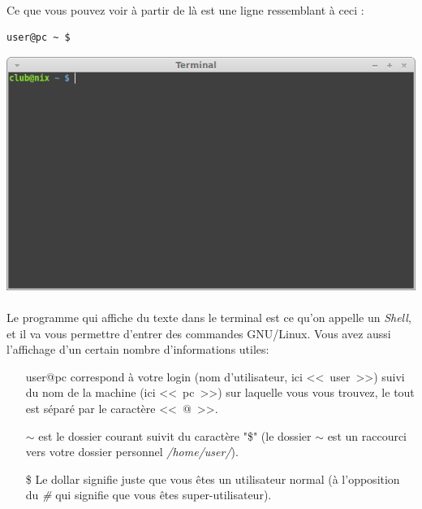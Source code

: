 \documentclass[french, a4paper, 12pt, titlepage]{article}
\begin{document}
\paragraph{} Ce que vous pouvez voir à partir de là est une ligne ressemblant à
ceci :
\begin{lstlisting}
user@pc ~ $
\end{lstlisting}


\begin{center}
	\includegraphics[scale=0.42]{Images/terminal}
\end{center}

\newpage
\paragraph{} Le programme qui affiche du texte dans le terminal est ce qu'on
appelle un \emph{Shell}, et il va vous permettre d'entrer des commandes
GNU/Linux. Vous avez aussi l'affichage d'un certain nombre d'informations
utiles:

\begin{enumerate}
	\item[user@pc] correspond à votre login (nom d'utilisateur, ici
		<<~user~>>) suivi du nom de la machine (ici <<~pc~>>) sur laquelle
		vous vous trouvez, le tout est séparé par le caractère <<~@~>>.
	\item[$\sim$] est le dossier courant suivit du caractère "\$"
		(le dossier $\sim$ est un raccourci vers votre dossier personnel
		\emph{/home/user/}).
	\item[\$] Le dollar signifie juste que vous êtes un utilisateur normal (à
		l'opposition du \emph{\#} qui signifie que vous êtes
		super-utilisateur).
\end{enumerate}
\end{document}
